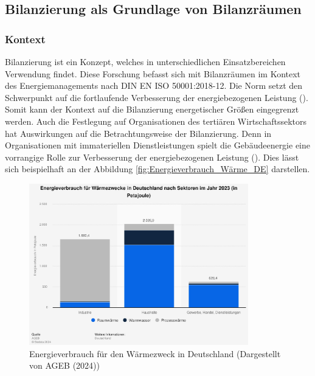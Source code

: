\subsection{Bilanzierung als Grundlage von Bilanzräumen}

\subsubsection{Kontext}

Bilanzierung ist ein Konzept, welches in unterschiedlichen Einsatzbereichen Verwendung findet. Diese Forschung befasst sich mit Bilanzräumen im Kontext des 
Energiemanagements nach DIN EN ISO 50001:2018-12. Die Norm setzt den Schwerpunkt auf die fortlaufende Verbesserung der energiebezogenen Leistung 
(\cite[Kapitel 0.2]{DIN50001.2018}). Somit kann der Kontext auf die Bilanzierung energetischer Größen eingegrenzt werden.
Auch die Festlegung auf Organisationen des tertiären Wirtschaftssektors hat Auswirkungen auf die Betrachtungsweise der Bilanzierung. Denn in Organisationen 
mit immateriellen Dienstleistungen spielt die Gebäudeenergie eine vorrangige Rolle zur Verbesserung der energiebezogenen Leistung (\cite[S. 3]{Fichera.2020}).
Dies lässt sich beispielhaft an der Abbildung \eqref{fig:Energieverbrauch_Wärme_DE} darstellen.

\begin{figure}[H]
    \centering
    \includegraphics[width=0.85\textwidth]{../../Ressourcen/Abbildungen/Energieverbrauch_für_Wärmezweck_DE.jpg}
    \caption{Energieverbrauch für den Wärmezweck in Deutschland (Dargestellt von AGEB (2024))}
    \label{fig:Energieverbrauch_Wärme_DE}
\end{figure}


